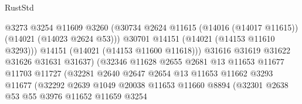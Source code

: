 \begin{lexlean}{RustStd}
\begin{coremodule}
                                          @3273
                                          @3254
                                          @11609
                                          @3260
                                          (@30734
                                            @2624
                                            @11615
                                            (@14016 (@14017 @11615))
                                            (@14021 (@14023 @2624 @53)))
                                          @30701
                                          @14151
                                          (@14021 (@14153 @11610 @3293)))
                                        @14151
                                        (@14021 (@14153 @11600 @11618)))
                                      @31616
                                      @31619
                                      @31622
                                      @31626
                                      @31631
                                      @31637)
                                    (@32346
                                      @11628
                                      @2655
                                      @2681
                                      @13
                                      @11653
                                      @11677
                                      @11703
                                      @11727
                                      (@32281
                                        @2640
                                        @2647
                                        @2654
                                        @13
                                        @11653
                                        @11662
                                        @3293
                                        @11677
                                        (@32292
                                          @2639
                                          @1049
                                          @20038
                                          @11653
                                          @11660
                                          @8894
                                          (@32301
                                            @2638
                                            @53
                                            @55
                                            @3976
                                            @11652
                                            @11659
                                            @3254

\end{coremodule}
\end{lexlean}
